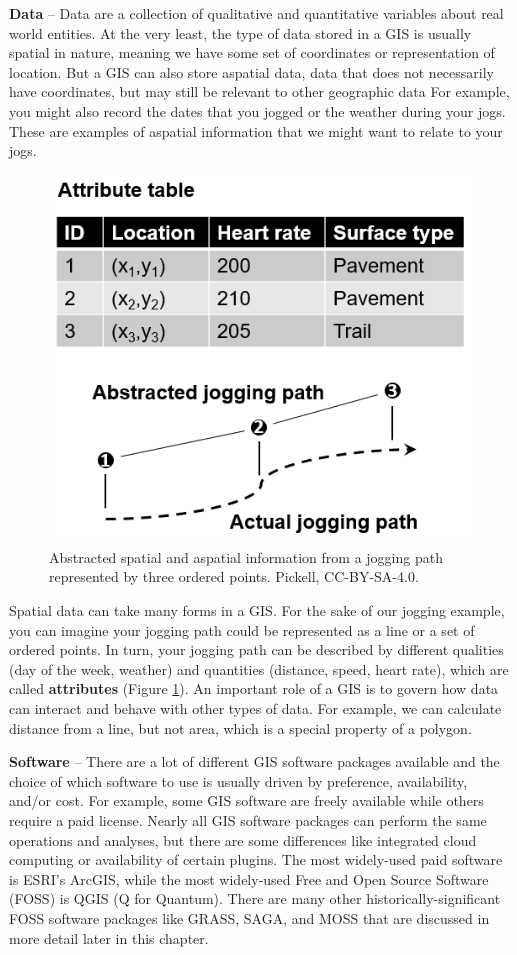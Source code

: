 \documentclass[
]{book}
\begin{document}
\textbf{Data} -- Data are a collection of qualitative and quantitative variables about real world entities. At the very least, the type of data stored in a GIS is usually spatial in nature, meaning we have some set of coordinates or representation of location. But a GIS can also store aspatial data, data that does not necessarily have coordinates, but may still be relevant to other geographic data For example, you might also record the dates that you jogged or the weather during your jogs. These are examples of aspatial information that we might want to relate to your jogs.

\begin{figure}
\includegraphics[width=0.75\linewidth]{images/01-jogging-path} \caption{Abstracted spatial and aspatial information from a jogging path represented by three ordered points. Pickell, CC-BY-SA-4.0.}\label{fig:1-jogging-path}
\end{figure}

Spatial data can take many forms in a GIS. For the sake of our jogging example, you can imagine your jogging path could be represented as a line or a set of ordered points. In turn, your jogging path can be described by different qualities (day of the week, weather) and quantities (distance, speed, heart rate), which are called \textbf{attributes} (Figure \ref{fig:1-jogging-path}). An important role of a GIS is to govern how data can interact and behave with other types of data. For example, we can calculate distance from a line, but not area, which is a special property of a polygon.

\textbf{Software} -- There are a lot of different GIS software packages available and the choice of which software to use is usually driven by preference, availability, and/or cost. For example, some GIS software are freely available while others require a paid license. Nearly all GIS software packages can perform the same operations and analyses, but there are some differences like integrated cloud computing or availability of certain plugins. The most widely-used paid software is ESRI's ArcGIS, while the most widely-used Free and Open Source Software (FOSS) is QGIS (Q for Quantum). There are many other historically-significant FOSS software packages like GRASS, SAGA, and MOSS that are discussed in more detail later in this chapter.
\end{document}
